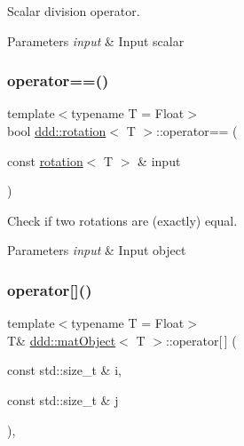Scalar division operator. 


\begin{DoxyParams}{Parameters}
{\em input} & Input scalar \\
\hline
\end{DoxyParams}
\mbox{\label{classddd_1_1rotation_ae704ea435ead1c66b7ca0bd4899ce2bc}} 
\subsubsection{\texorpdfstring{operator==()}{operator==()}}
{\footnotesize\ttfamily template$<$typename T  = Float$>$ \\
bool \hyperlink{classddd_1_1rotation}{ddd\+::rotation}$<$ T $>$\+::operator== (\begin{DoxyParamCaption}\item[{const \hyperlink{classddd_1_1rotation}{rotation}$<$ T $>$ \&}]{input }\end{DoxyParamCaption})\hspace{0.3cm}{\ttfamily [inline]}}



Check if two rotations are (exactly) equal. 


\begin{DoxyParams}{Parameters}
{\em input} & Input object \\
\hline
\end{DoxyParams}
\mbox{\label{classddd_1_1mat_object_a361b78105da1bb2151f51f674a20d59a}} 
\subsubsection{\texorpdfstring{operator[]()}{operator[]()}\hspace{0.1cm}{\footnotesize\ttfamily [1/2]}}
{\footnotesize\ttfamily template$<$typename T  = Float$>$ \\
T\& \hyperlink{classddd_1_1mat_object}{ddd\+::mat\+Object}$<$ T $>$\+::operator\mbox{[}$\,$\mbox{]} (\begin{DoxyParamCaption}\item[{const std\+::size\+\_\+t \&}]{i,  }\item[{const std\+::size\+\_\+t \&}]{j }\end{DoxyParamCaption})\hspace{0.3cm}{\ttfamily [inline]}, {\ttfamily [inherited]}}



